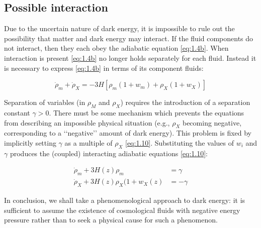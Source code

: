 \subsection{Possible interaction}
\label{subsec:possible-interaction}

Due to the uncertain nature of dark energy, it is impossible to rule out the possibility that matter and dark energy may interact. If the fluid components do not interact, then they each obey the adiabatic equation \cref{eq:1.4b}. When interaction is present \cref{eq:1.4b} no longer holds separately for each fluid. Instead it is necessary to express \cref{eq:1.4b} in terms of its component fluids:

\begin{equation}
    \dot{\rho}_{m} + \dot{\rho}_{X} 
    = -3H \left[ 
        \rho_{m} \left( 1 + w_{m} \right) + \rho_{X} \left( 1 + w_{X} \right)
    \right]
\label{eq:1.9}
\end{equation}

Separation of variables (in $\rho_M$ and $\rho_X$) requires the introduction of a separation constant $\gamma > 0$. There must be some mechanism which prevents the equations from describing an impossible physical situation (e.g., $\rho_X$ becoming negative, corresponding to a \lq\lq{}negative\rq\rq{} amount of dark energy). This problem is fixed by implicitly setting $\gamma$ as a multiple of $\rho_X$ \cref{eq:1.10}. Substituting the values of $w_i$ and $\gamma$ produces the (coupled) interacting adiabatic equations \cref{eq:1.10}:

\begin{subequations}\label{eq:1.10}
\begin{align}
    \dot{\rho}_{m} + 3H(z) \rho_{m} &= \gamma{}
\label{eq:1.10a} \\
    \dot{\rho}_{X} + 3H(z) \rho_{X} ( 1 + w_{X}(z) &= -\gamma{}
\label{eq:1.10b}
\end{align}
\end{subequations}

In conclusion, we shall take a phenomenological approach to dark energy: it is sufficient to assume the existence of cosmological fluids with negative energy pressure rather than to seek a physical cause for such a phenomenon.
